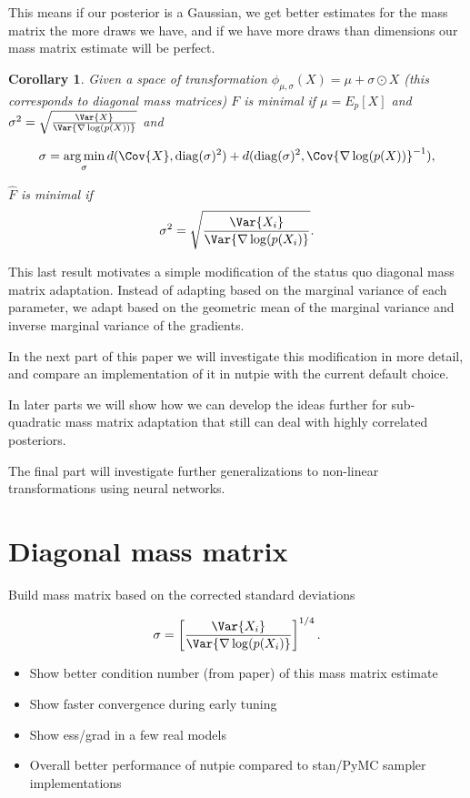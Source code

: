 \documentclass{scrartcl}
\DeclareMathOperator{\diag}{diag}
\DeclareMathOperator*{\argmin}{arg\,min}
\newtheorem{cor}{Corollary}
\begin{document}
This means if our posterior is a Gaussian, we get better estimates for the mass
matrix the more draws we have, and if we have more draws than dimensions our
mass matrix estimate will be perfect.

\begin{cor}
Given a space of transformation $\phi_{\mu, \sigma}(X) = \mu + \sigma \odot X$
(this corresponds to diagonal mass matrices) $F$ is minimal if $\mu =
E_p[X]$ and $\sigma^2 = \sqrt{\frac{\Var{X}}{\Var{\nabla \log(p(X))}}}$
and

\[
\sigma
  = \argmin_{\sigma} d(\Cov{X}, \diag(\sigma)^2)
    + d(\diag(\sigma)^2, \Cov{\nabla\log(p(X))}^{-1}),
\]

$\hat F$ is minimal if
\[
\sigma^2 = \sqrt{\frac{\Var{X_i}}{\Var{\nabla \log(p(X_i)}}}.
\]
\end{cor}

This last result motivates a simple modification of the status quo diagonal
mass matrix adaptation. Instead of adapting based on the marginal variance of
each parameter, we adapt based on the geometric mean of the marginal variance
and inverse marginal variance of the gradients.

In the next part of this paper we will investigate this modification in more
detail, and compare an implementation of it in nutpie with the current default
choice.

In later parts we will show how we can develop the ideas further for
sub-quadratic mass matrix adaptation that still can deal with highly correlated
posteriors.

The final part will investigate further generalizations to non-linear
transformations using neural networks.

\section{Diagonal mass matrix}

Build mass matrix based on the corrected standard deviations

\[
\sigma = \left[\frac{\Var{X_i}}{\Var{\nabla \log(p(X_i)}}\right]^{1/4}.
\]

\begin{itemize}
\item Show better condition number (from paper) of this mass matrix estimate
\item Show faster convergence during early tuning
\item Show ess/grad in a few real models
\item Overall better performance of nutpie compared to stan/PyMC sampler
implementations
\end{itemize}
\end{document}
